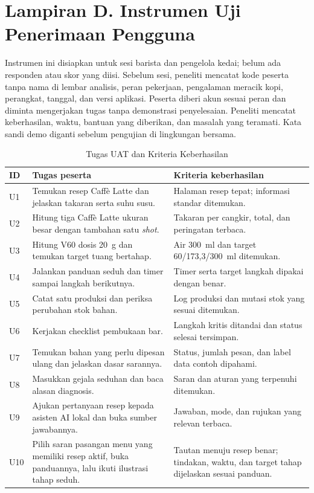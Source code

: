 \section*{Lampiran D. Instrumen Uji Penerimaan Pengguna}
{}

Instrumen ini disiapkan untuk sesi barista dan pengelola kedai; belum ada responden atau skor yang diisi. Sebelum sesi, peneliti mencatat kode peserta tanpa nama di lembar analisis, peran pekerjaan, pengalaman meracik kopi, perangkat, tanggal, dan versi aplikasi. Peserta diberi akun sesuai peran dan diminta mengerjakan tugas tanpa demonstrasi penyelesaian. Peneliti mencatat keberhasilan, waktu, bantuan yang diberikan, dan masalah yang teramati. Kata sandi demo diganti sebelum pengujian di lingkungan bersama.

\begin{table}[H]
\centering
\caption{Tugas UAT dan Kriteria Keberhasilan}
\label{tab:lampiran-uat}
\small
\begin{tabular}{l>{\RaggedRight\arraybackslash}p{}>{\RaggedRight\arraybackslash}p{}}
\toprule
ID & Tugas peserta & Kriteria keberhasilan \\
\midrule
U1 & Temukan resep Caffè Latte dan jelaskan takaran serta suhu susu. & Halaman resep tepat; informasi standar ditemukan. \\
U2 & Hitung tiga Caffè Latte ukuran besar dengan tambahan satu \textit{shot}. & Takaran per cangkir, total, dan peringatan terbaca. \\
U3 & Hitung V60 dosis 20~g dan temukan target tuang bertahap. & Air 300~ml dan target 60/173,3/300~ml ditemukan. \\
U4 & Jalankan panduan seduh dan timer sampai langkah berikutnya. & Timer serta target langkah dipakai dengan benar. \\
U5 & Catat satu produksi dan periksa perubahan stok bahan. & Log produksi dan mutasi stok yang sesuai ditemukan. \\
U6 & Kerjakan checklist pembukaan bar. & Langkah kritis ditandai dan status selesai tersimpan. \\
U7 & Temukan bahan yang perlu dipesan ulang dan jelaskan dasar sarannya. & Status, jumlah pesan, dan label data contoh dipahami. \\
U8 & Masukkan gejala seduhan dan baca alasan diagnosis. & Saran dan aturan yang terpenuhi ditemukan. \\
U9 & Ajukan pertanyaan resep kepada asisten AI lokal dan buka sumber jawabannya. & Jawaban, mode, dan rujukan yang relevan terbaca. \\
U10 & Pilih saran pasangan menu yang memiliki resep aktif, buka panduannya, lalu ikuti ilustrasi tahap seduh. & Tautan menuju resep benar; tindakan, waktu, dan target tahap dijelaskan sesuai panduan. \\
\bottomrule
\end{tabular}
\end{table}

